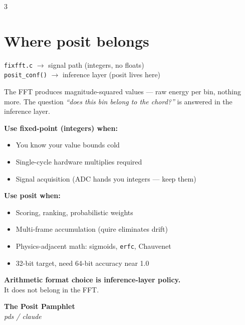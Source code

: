 \documentclass[10pt]{article}
\begin{document}
\begin{multicols}{3}
\section*{Where posit belongs}
\vspace{2pt}
\begin{mdframed}[linewidth=0.4pt,innerleftmargin=6pt,
                 innerrightmargin=4pt,innertopmargin=5pt,
                 innerbottommargin=5pt]
\texttt{fixfft.c} $\to$ signal path (integers, no floats)\\[4pt]
\texttt{posit\_conf()} $\to$ inference layer (posit lives here)
\end{mdframed}

\noindent The FFT produces magnitude-squared values ---
raw energy per bin, nothing more.
The question \emph{``does this bin belong to the chord?''}
is answered in the inference layer.

\medskip
\noindent \textbf{Use fixed-point (integers) when:}
\begin{itemize}\setlength\itemsep{1pt}
  \item You know your value bounds cold
  \item Single-cycle hardware multiplies required
  \item Signal acquisition (ADC hands you integers --- keep them)
\end{itemize}

\noindent \textbf{Use posit when:}
\begin{itemize}\setlength\itemsep{1pt}
  \item Scoring, ranking, probabilistic weights
  \item Multi-frame accumulation (quire eliminates drift)
  \item Physics-adjacent math: sigmoids, \texttt{erfc}, Chauvenet
  \item 32-bit target, need 64-bit accuracy near 1.0
\end{itemize}

\medskip
\noindent \textbf{Arithmetic format choice is inference-layer policy.}\\
It does not belong in the FFT.

\columnbreak

\begin{center}
  \vspace*{1.5em}
  {\large\bfseries The Posit Pamphlet}\\[6pt]
  {\small\itshape pds / claude }\\[1.5em]


\end{center}
\end{multicols}
\end{document}

